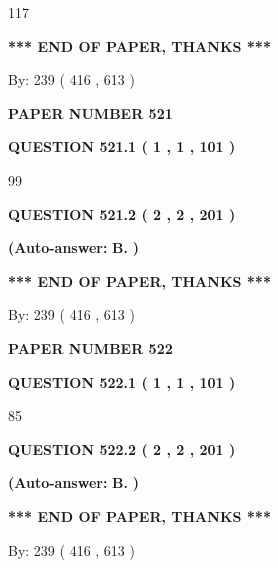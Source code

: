 \documentclass{ctexart}
\begin{document}
117
   
   
   
   
\vspace{1.0in} 
{\textbf{\large{ *** END OF PAPER, THANKS *** }}} 
   
   
\hspace{1.0in} By: 
 239 ( 416 ,  613 )
   
   
   
   
\newpage 
\setcounter{page}{ 
   521001 } 
   
   
 {\textbf{ \Large{ PAPER NUMBER  521  }}}
   
   
   
   
  
  
{\textbf{\large{QUESTION
521.1 
 ( 1 , 1 , 101 )
}}}

99
  
  
{\textbf{\large{QUESTION
521.2 
 ( 2 , 2 , 201 )
}}}
 
 
{\textbf{(Auto-answer:}}
{\textbf{\large{
B.}}}
{\textbf{)}}
 
 
   
   
   
   
\vspace{1.0in} 
{\textbf{\large{ *** END OF PAPER, THANKS *** }}} 
   
   
\hspace{1.0in} By: 
 239 ( 416 ,  613 )
   
   
   
   
\newpage 
\setcounter{page}{ 
   522001 } 
   
   
 {\textbf{ \Large{ PAPER NUMBER  522  }}}
   
   
   
   
  
  
{\textbf{\large{QUESTION
522.1 
 ( 1 , 1 , 101 )
}}}

85
  
  
{\textbf{\large{QUESTION
522.2 
 ( 2 , 2 , 201 )
}}}
 
 
{\textbf{(Auto-answer:}}
{\textbf{\large{
B.}}}
{\textbf{)}}
 
 
   
   
   
   
\vspace{1.0in} 
{\textbf{\large{ *** END OF PAPER, THANKS *** }}} 
   
   
\hspace{1.0in} By: 
 239 ( 416 ,  613 )
   
   
   
   
\newpage 
\setcounter{page}{ 
   523001 } 
   
\end{document}
